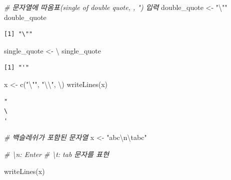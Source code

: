 \documentclass[
  11pt,
]{krantz}
\newenvironment{Shaded}{\begin{snugshade}}{\end{snugshade}}
\newcommand{\CommentTok}[1]{\textcolor[rgb]{0.37,0.37,0.37}{\textit{#1}}}
\newcommand{\FunctionTok}[1]{\textcolor[rgb]{0,0,0}{#1}}
\newcommand{\NormalTok}[1]{#1}
\newcommand{\OtherTok}[1]{\textcolor[rgb]{0.37,0.37,0.37}{#1}}
\newcommand{\SpecialCharTok}[1]{\textcolor[rgb]{0,0,0}{#1}}
\newcommand{\StringTok}[1]{\textcolor[rgb]{0.5,0.5,0.5}{#1}}
\begin{document}
\footnotesize

\begin{Shaded}
\begin{Highlighting}[]
\CommentTok{\# 문자열에 따옴표(single of double quote, \textquotesingle{}, ") 입력}
\NormalTok{double\_quote }\OtherTok{\textless{}{-}} \StringTok{"}\SpecialCharTok{\textbackslash{}"}\StringTok{"} 
\NormalTok{double\_quote}
\end{Highlighting}
\end{Shaded}

\begin{verbatim}
[1] "\""
\end{verbatim}

\begin{Shaded}
\begin{Highlighting}[]
\NormalTok{single\_quote }\OtherTok{\textless{}{-}} \StringTok{\textquotesingle{}}\SpecialCharTok{\textbackslash{}\textquotesingle{}}\StringTok{\textquotesingle{}} 
\NormalTok{single\_quote}
\end{Highlighting}
\end{Shaded}

\begin{verbatim}
[1] "'"
\end{verbatim}

\begin{Shaded}
\begin{Highlighting}[]
\NormalTok{x }\OtherTok{\textless{}{-}} \FunctionTok{c}\NormalTok{(}\StringTok{"}\SpecialCharTok{\textbackslash{}"}\StringTok{"}\NormalTok{, }\StringTok{"}\SpecialCharTok{\textbackslash{}\textbackslash{}}\StringTok{"}\NormalTok{, }\StringTok{\textquotesingle{}}\SpecialCharTok{\textbackslash{}\textquotesingle{}}\StringTok{\textquotesingle{}}\NormalTok{)}
\FunctionTok{writeLines}\NormalTok{(x)}
\end{Highlighting}
\end{Shaded}

\begin{verbatim}
"
\
'
\end{verbatim}

\begin{Shaded}
\begin{Highlighting}[]
\CommentTok{\# 백슬레쉬가 포함된 문자열}
\NormalTok{x }\OtherTok{\textless{}{-}} \StringTok{"abc}\SpecialCharTok{\textbackslash{}n\textbackslash{}t}\StringTok{abc"}

\CommentTok{\# \textbackslash{}n: Enter}
\CommentTok{\# \textbackslash{}t: tab 문자를 표현}

\FunctionTok{writeLines}\NormalTok{(x)}
\end{Highlighting}
\end{Shaded}
\end{document}
